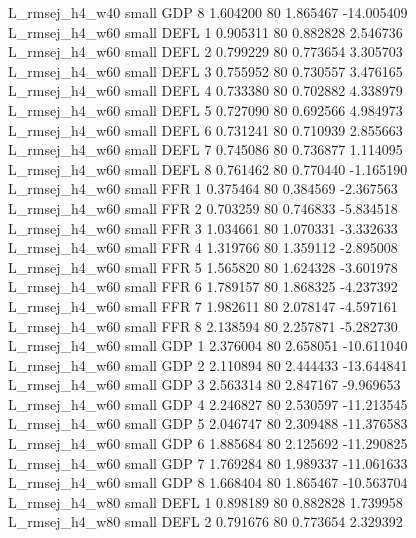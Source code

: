 L_rmsej_h4_w40      small      GDP                 8 1.604200 80       1.865467         -14.005409
L_rmsej_h4_w60      small     DEFL                 1 0.905311 80       0.882828           2.546736
L_rmsej_h4_w60      small     DEFL                 2 0.799229 80       0.773654           3.305703
L_rmsej_h4_w60      small     DEFL                 3 0.755952 80       0.730557           3.476165
L_rmsej_h4_w60      small     DEFL                 4 0.733380 80       0.702882           4.338979
L_rmsej_h4_w60      small     DEFL                 5 0.727090 80       0.692566           4.984973
L_rmsej_h4_w60      small     DEFL                 6 0.731241 80       0.710939           2.855663
L_rmsej_h4_w60      small     DEFL                 7 0.745086 80       0.736877           1.114095
L_rmsej_h4_w60      small     DEFL                 8 0.761462 80       0.770440          -1.165190
L_rmsej_h4_w60      small      FFR                 1 0.375464 80       0.384569          -2.367563
L_rmsej_h4_w60      small      FFR                 2 0.703259 80       0.746833          -5.834518
L_rmsej_h4_w60      small      FFR                 3 1.034661 80       1.070331          -3.332633
L_rmsej_h4_w60      small      FFR                 4 1.319766 80       1.359112          -2.895008
L_rmsej_h4_w60      small      FFR                 5 1.565820 80       1.624328          -3.601978
L_rmsej_h4_w60      small      FFR                 6 1.789157 80       1.868325          -4.237392
L_rmsej_h4_w60      small      FFR                 7 1.982611 80       2.078147          -4.597161
L_rmsej_h4_w60      small      FFR                 8 2.138594 80       2.257871          -5.282730
L_rmsej_h4_w60      small      GDP                 1 2.376004 80       2.658051         -10.611040
L_rmsej_h4_w60      small      GDP                 2 2.110894 80       2.444433         -13.644841
L_rmsej_h4_w60      small      GDP                 3 2.563314 80       2.847167          -9.969653
L_rmsej_h4_w60      small      GDP                 4 2.246827 80       2.530597         -11.213545
L_rmsej_h4_w60      small      GDP                 5 2.046747 80       2.309488         -11.376583
L_rmsej_h4_w60      small      GDP                 6 1.885684 80       2.125692         -11.290825
L_rmsej_h4_w60      small      GDP                 7 1.769284 80       1.989337         -11.061633
L_rmsej_h4_w60      small      GDP                 8 1.668404 80       1.865467         -10.563704
L_rmsej_h4_w80      small     DEFL                 1 0.898189 80       0.882828           1.739958
L_rmsej_h4_w80      small     DEFL                 2 0.791676 80       0.773654           2.329392
